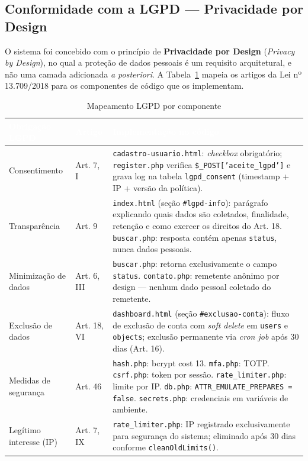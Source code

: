 \documentclass[12pt,a4paper]{article}
\begin{document}
\subsection{Conformidade com a LGPD — Privacidade por Design}

O sistema foi concebido com o princípio de \textbf{Privacidade por Design}
(\textit{Privacy by Design}), no qual a proteção de dados pessoais é um requisito
arquitetural, e não uma camada adicionada \textit{a posteriori}.
A Tabela~\ref{tab:lgpd} mapeia os artigos da Lei nº 13.709/2018 para os
componentes de código que os implementam.

\begin{table}[H]
  \centering
  \caption{Mapeamento LGPD por componente}
  \label{tab:lgpd}
  \small
  \renewcommand{\arraystretch}{1.4}
  \begin{tabularx}{\textwidth}{|l|l|X|}
    \hline
    \rowcolor{cinzaHeader}
    \textcolor{white}{\textbf{Obrigação LGPD}} &
    \textcolor{white}{\textbf{Artigo}} &
    \textcolor{white}{\textbf{Implementação no código}} \\
    \hline
    Consentimento &
    Art. 7, I &
    \texttt{cadastro-usuario.html}: \textit{checkbox} obrigatório; \texttt{register.php} verifica \texttt{\$\_POST['aceite\_lgpd']} e grava log na tabela \texttt{lgpd\_consent} (timestamp + IP + versão da política). \\
    \hline
    Transparência &
    Art. 9 &
    \texttt{index.html} (seção \texttt{\#lgpd-info}): parágrafo explicando quais dados são coletados, finalidade, retenção e como exercer os direitos do Art. 18. \texttt{buscar.php}: resposta contém apenas \texttt{status}, nunca dados pessoais. \\
    \hline
    Minimização de dados &
    Art. 6, III &
    \texttt{buscar.php}: retorna exclusivamente o campo \texttt{status}. \texttt{contato.php}: remetente anônimo por design — nenhum dado pessoal coletado do remetente. \\
    \hline
    Exclusão de dados &
    Art. 18, VI &
    \texttt{dashboard.html} (seção \texttt{\#exclusao-conta}): fluxo de exclusão de conta com \textit{soft delete} em \texttt{users} e \texttt{objects}; exclusão permanente via \textit{cron job} após 30 dias (Art. 16). \\
    \hline
    Medidas de segurança &
    Art. 46 &
    \texttt{hash.php}: bcrypt cost 13. \texttt{mfa.php}: TOTP. \texttt{csrf.php}: token por sessão. \texttt{rate\_limiter.php}: limite por IP. \texttt{db.php}: \texttt{ATTR\_EMULATE\_PREPARES = false}. \texttt{secrets.php}: credenciais em variáveis de ambiente. \\
    \hline
    Legítimo interesse (IP) &
    Art. 7, IX &
    \texttt{rate\_limiter.php}: IP registrado exclusivamente para segurança do sistema; eliminado após 30 dias conforme \texttt{cleanOldLimits()}. \\
    \hline
  \end{tabularx}
\end{table}
\end{document}
